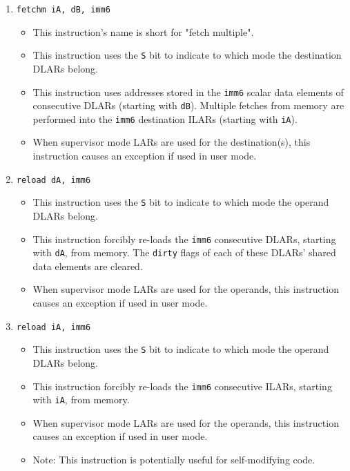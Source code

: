 \documentclass{article}
\begin{document}
\begin{itemize}
\begin{enumerate}
			\item \texttt{fetchm iA, dB, imm6}
				\begin{itemize}
				\item This instruction's name is short for "fetch
					multiple".
				\item This instruction uses the \texttt{S} bit to indicate
					to which mode the destination DLARs belong.
				\item This instruction uses addresses stored in the
					\texttt{imm6} scalar data elements of consecutive DLARs
					(starting with \texttt{dB}). Multiple fetches from
					memory are performed into the \texttt{imm6} destination
					ILARs (starting with \texttt{iA}).
				\item When supervisor mode LARs are used for the
					destination(s), this instruction causes an exception if
					used in user mode.
				\end{itemize}
			\item \texttt{reload dA, imm6}
				\begin{itemize}
				\item This instruction uses the \texttt{S} bit to indicate
					to which mode the operand DLARs belong.
				\item This instruction forcibly re-loads the \texttt{imm6}
					consecutive DLARs, starting with \texttt{dA}, from
					memory. The \texttt{dirty} flags of each of these
					DLARs' shared data elements are cleared.
				\item When supervisor mode LARs are used for the operands,
					this instruction causes an exception if used in user
					mode.
				\end{itemize}
			\item \texttt{reload iA, imm6}
				\begin{itemize}
				\item This instruction uses the \texttt{S} bit to indicate
					to which mode the operand DLARs belong.
				\item This instruction forcibly re-loads the \texttt{imm6}
					consecutive ILARs, starting with \texttt{iA}, from
					memory.
				\item When supervisor mode LARs are used for the operands,
					this instruction causes an exception if used in user
					mode.
				\item Note: This instruction is potentially useful for
					self-modifying code.
				\end{itemize}

\end{enumerate}
\end{itemize}
\end{document}
